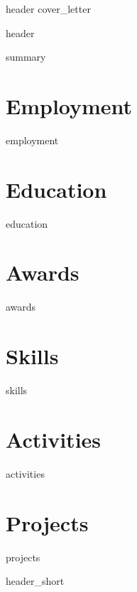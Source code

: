 \documentclass[11pt, letterpaper]{article}
\begin{document}
{header}
{cover_letter}

\pagebreak


\setlength{\parskip}{0pt}


{header}

{summary}

\section{Employment}
{employment}

\section{Education}
{education}

\section{Awards}
{awards}

\section{Skills}
{skills}

\section{Activities}
{activities}


% 

\section{Projects}
{projects}

\pagebreak

{header_short}
\end{document}
